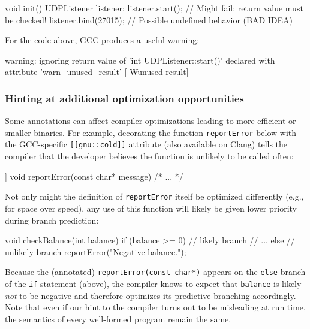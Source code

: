 \begin{emcppslisting}[language=C++]
void init()
{
    UDPListener listener;
    listener.start();      // Might fail; return value must be checked!
    listener.bind(27015);  // Possible undefined behavior (BAD IDEA)
}
\end{emcppslisting}

\noindent For the code above, GCC produces a useful warning:

\begin{emcppslisting}[style=plain]
warning: ignoring return value of 'int UDPListener::start()' declared
         with attribute 'warn_unused_result' [-Wunused-result]
\end{emcppslisting}


\subsubsection[Hinting at additional optimization opportunities]{Hinting at additional optimization opportunities}\label{hinting-at-additional-optimization-opportunities}

Some annotations can affect compiler optimizations leading to more
efficient or smaller binaries. For example, decorating the function
\lstinline!reportError! below with the GCC-specific
\lstinline![[gnu::cold]]! attribute (also available on Clang) tells the
compiler that the developer believes the function is unlikely to be
called often:

\begin{emcppslisting}[language=C++]
[[gnu::cold]] void reportError(const char* message) { /* ... */ }
\end{emcppslisting}

\noindent Not only might the definition of \lstinline!reportError! itself be
optimized differently (e.g., for space over speed), any use of this
function will likely be given lower priority during branch \mbox{prediction}:

\begin{emcppslisting}[language=C++]
void checkBalance(int balance)
{
    if (balance >= 0)  // likely branch
    {
        // ...
    }
    else  // unlikely branch
    {
        reportError("Negative balance.");
    }
}
\end{emcppslisting}

\noindent Because the (annotated) \lstinline!reportError(const!~\lstinline!char*)!
appears on the \lstinline!else! branch of the \lstinline!if! statement (above), the compiler
knows to expect that \lstinline!balance! is likely \emph{not} to be
negative and therefore optimizes its predictive branching accordingly.
Note that even if our hint to the compiler turns out to be misleading at
run time, the semantics of every well-formed program remain the same.


